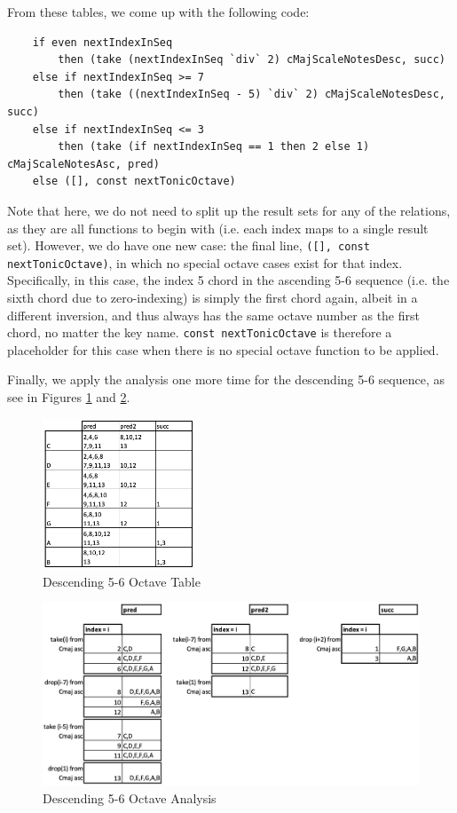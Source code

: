 \documentclass{report}
\begin{document}
From these tables, we come up with the following code:

\begin{verbatim}
    if even nextIndexInSeq 
        then (take (nextIndexInSeq `div` 2) cMajScaleNotesDesc, succ)
    else if nextIndexInSeq >= 7  
        then (take ((nextIndexInSeq - 5) `div` 2) cMajScaleNotesDesc, succ)
    else if nextIndexInSeq <= 3 
        then (take (if nextIndexInSeq == 1 then 2 else 1) cMajScaleNotesAsc, pred)
    else ([], const nextTonicOctave)  
\end{verbatim}

\noindent Note that here, we do not need to split up the  result sets for any of the relations,  as they are all functions to begin with (i.e. each index maps to a single result set). However, we do have one new case: the final line, \verb.([], const nextTonicOctave)., in which no special octave cases exist for that index. Specifically, in this case, the index 5 chord in the ascending 5-6 sequence (i.e. the sixth chord due to zero-indexing) is simply the first chord again, albeit in a different inversion, and thus always has the same octave number as the first chord, no matter the key name. \verb.const nextTonicOctave. is therefore a placeholder for this case when there is  no special octave function to be applied.
         
Finally, we apply the analysis one more time for the descending 5-6 sequence, as see in Figures \ref{fig:desc_56_octave_grid} and  \ref{fig:desc_56_octave_analysis}.

\begin{figure}[h!]
\centering
\includegraphics[width=0.4\textwidth]{images/desc56_octave_grid}
  \caption{Descending 5-6 Octave Table}
  \label{fig:desc_56_octave_grid}
\end{figure}

\begin{figure}[h!]
\centering
\includegraphics[width=\textwidth]{images/desc56_octave_analysis}
  \caption{Descending 5-6 Octave Analysis}
  \label{fig:desc_56_octave_analysis}
\end{figure}
\newpage
\end{document}
